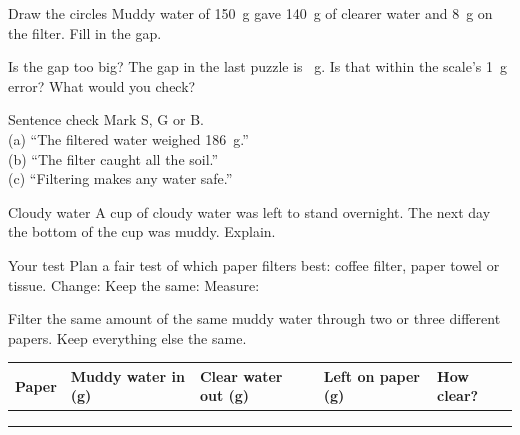 \clearpage

\begin{puzzle}{Draw the circles}
Muddy water of 150~g gave 140~g of clearer water and 8~g on the filter. Fill in the gap.
\begin{center}
\end{center}
\end{puzzle}

\begin{puzzle}{Is the gap too big?}
The gap in the last puzzle is \wline[1.6cm]~g. Is that within the scale's 1~g error? \wline[2cm] What would you check? \wline[4cm]
\end{puzzle}

\begin{puzzle}{Sentence check}
Mark S, G or B.\\
(a) ``The filtered water weighed 186~g.'' \wline[1cm]\\
(b) ``The filter caught all the soil.'' \wline[1cm]\\
(c) ``Filtering makes any water safe.'' \wline[1cm]
\end{puzzle}

\begin{puzzle}{Cloudy water}
A cup of cloudy water was left to stand overnight. The next day the bottom of the cup was muddy. Explain. \wline[6cm]
\end{puzzle}

\begin{puzzle}{Your test}
Plan a fair test of which paper filters best: coffee filter, paper towel or tissue. Change: \wline[3cm] Keep the same: \wline[4cm] Measure: \wline[3cm]
\end{puzzle}
\clearpage

\thispagestyle{fancy}
Filter the same amount of the same muddy water through two or three different papers. Keep everything else the same.\par\medskip
\renewcommand{\arraystretch}{3.0}
\begin{tabularx}{\linewidth}{|>{\sffamily\small\bfseries}p{2.8cm}|X|X|X|X|}
\hline
Paper & Muddy water in (g) & Clear water out (g) & Left on paper (g) & How clear? \\ \hline
 & & & & \\ \hline
 & & & & \\ \hline
 & & & & \\ \hline
\end{tabularx}

